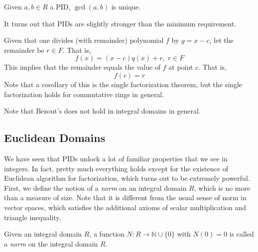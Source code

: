   \begin{theorem}
    Given $a, b \in R$ a PID, $\gcd(a, b)$ is unique. 
  \end{theorem}

  \begin{lemma}
    
  \end{lemma}

  It turns out that PIDs are slightly stronger than the minimum requirement. 

  \begin{theorem}
    Given that one divides (with remainder) polynomial $f$ by $g = x - c$, let the remainder be $r \in F$. That is, 
    \begin{equation}
      f(x) = (x-c) q(x) + r, \; r \in F
    \end{equation}
    This implies that the remainder equals the value of $f$ at point $c$. That is, 
    \begin{equation}
      f(c) = r
    \end{equation}
    Note that a corollary of this is the single factorization theorem, but the single factorization holds for commutative rings in general. 
  \end{theorem} 

  Note that Bezout's does not hold in integral domains in general. 
  
  \begin{example}
    
  \end{example}

\subsection{Euclidean Domains}

  We have seen that PIDs unlock a lot of familiar properties that we see in integers. In fact, pretty much everything holds except for the existence of Euclidean algorithm for factorization, which turns out to be extremely powerful. First, we define the notion of a \textit{norm} on an integral domain $R$, which is no more than a measure of size. Note that it is different from the usual sense of norm in vector spaces, which satisfies the additional axioms of scalar multiplication and triangle inequality. 

  \begin{definition}
    Given an integral domain $R$, a function $N: R \to \mathbb{N} \cup \{0\}$ with $N(0) = 0$ is called a \textit{norm} on the integral domain $R$. 
  \end{definition}

